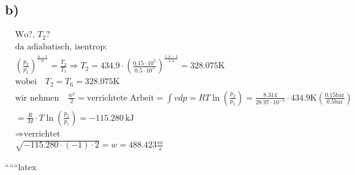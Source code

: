 

\subsection*{b)}

\begin{align*}
&\text{Wo?}, \, T_2? \\
&\text{da adiabatisch, isentrop:} \\
&\left( \frac{p_2}{p_1} \right)^{\frac{n-1}{n}} = \frac{T_2}{T_1} \Rightarrow T_2 = 434.9 \cdot \left( \frac{0.15 \cdot 10^5}{0.5 \cdot 10^5} \right)^{\frac{1.4-1}{1.4}} = 328.075 \text{K} \\
&\text{wobei} \quad T_2 = T_6 = 328.075 \text{K} \\
&\text{wir nehmen} \quad \frac{w^2}{2} = \text{verrichtete Arbeit} = \int vdp = RT \ln \left( \frac{p_2}{p_1} \right) = \frac{8.314}{28.97 \cdot 10^{-3}} \cdot 434.9 \text{K} \left( \frac{0.15 \text{bar}}{0.5 \text{bar}} \right) \\
&= \frac{R}{M} \cdot T \ln \left( \frac{p_2}{p_1} \right) = -115.280 \, \text{kJ} \\
&\Rightarrow \text{verrichtet} \\
&\sqrt{-115.280 \cdot (-1) \cdot 2} = w = 488.423 \frac{m}{s}
\end{align*}

``````latex